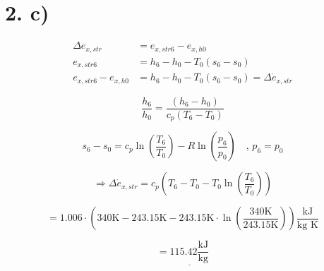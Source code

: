 \section*{2. c)}

\begin{align*}
\Delta e_{x,str} &= e_{x,str6} - e_{x,h0} \\
e_{x,str6} &= h_6 - h_0 - T_0 (s_6 - s_0) \\
e_{x,str6} - e_{x,h0} &= h_6 - h_0 - T_0 (s_6 - s_0) = \Delta \dot{e}_{x,str}
\end{align*}

\[
\frac{h_6}{h_0} = \frac{(h_6 - h_0)}{c_p (T_6 - T_0)}
\]

\[
s_6 - s_0 = c_p \ln \left( \frac{T_6}{T_0} \right) - R \ln \left( \frac{p_6}{p_0} \right) \quad \text{, } p_6 = p_0
\]

\[
\Rightarrow \Delta \dot{e}_{x,str} = c_p \left( T_6 - T_0 - T_0 \ln \left( \frac{T_6}{T_0} \right) \right)
\]

\[
= 1.006 \cdot \left( 340 \text{K} - 243.15 \text{K} - 243.15 \text{K} \cdot \ln \left( \frac{340 \text{K}}{243.15 \text{K}} \right) \right) \frac{\text{kJ}}{\text{kg K}}
\]

\[
= \underline{115.42 \frac{\text{kJ}}{\text{kg}}}
\]